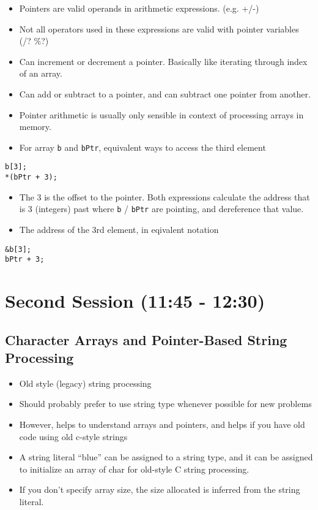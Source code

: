 \documentclass[11pt]{article}
\begin{document}
\begin{itemize}
\item Pointers are valid operands in arithmetic expressions. (e.g. +/-)
\item Not all operators used in these expressions are valid with pointer variables (/? \%?)
\item Can increment or decrement a pointer.  Basically like iterating through index of an array.
\item Can add or subtract to a pointer, and can subtract one pointer from another.
\item Pointer arithmetic is usually only sensible in context of processing arrays in memory.
\item For array \verb~b~ and \verb~bPtr~, equivalent ways to access the third element
\end{itemize}


\begin{verbatim}
b[3];
*(bPtr + 3);
\end{verbatim}

\begin{itemize}
\item The 3 is the offset to the pointer.  Both expressions calculate the
  address that is 3 (integers) past where \verb~b~ / \verb~bPtr~ are pointing,
  and dereference that value.
\item The address of the 3rd element, in eqivalent notation
\end{itemize}


\begin{verbatim}
&b[3];
bPtr + 3;
\end{verbatim}
\section{Second Session (11:45 - 12:30)}
\label{sec-2}
\subsection{Character Arrays and Pointer-Based String Processing}
\label{sec-2-1}

\begin{itemize}
\item Old style (legacy) string processing
\item Should probably prefer to use string type whenever possible for new problems
\item However, helps to understand arrays and pointers, and helps if you have old code using old c-style strings
\item A string literal ``blue'' can be assigned to a string type, and it can
  be assigned to initialize an array of char for old-style C string
  processing.
\item If you don't specify array size, the size allocated is inferred from the string literal.
\end{itemize}
\end{document}

